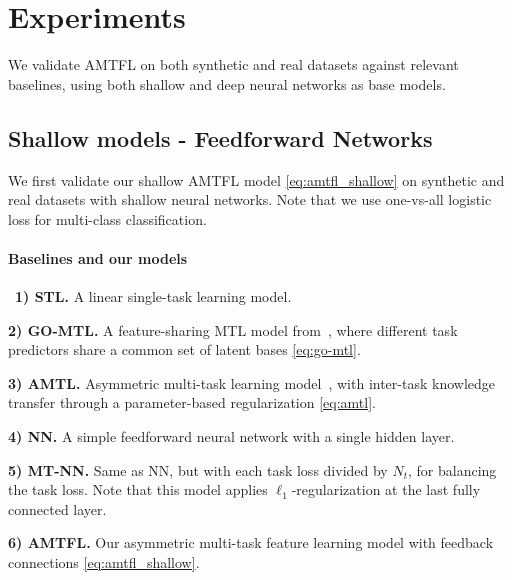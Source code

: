 \documentclass{article}
\begin{document}
	\section{Experiments}
	We validate AMTFL on both synthetic and real datasets against relevant baselines, using both shallow and deep neural networks as base models. 
	
	\subsection{Shallow models - Feedforward Networks}
	We first validate our shallow AMTFL model \eqref{eq:amtfl_shallow} on synthetic and real datasets with shallow neural networks. Note that we use one-vs-all logistic loss for multi-class classification.
	\paragraph{Baselines and our models}
	\ \newline \noindent \textbf{1) STL.} A linear single-task learning model.
	
	\noindent \textbf{2) GO-MTL.} A feature-sharing MTL model from~\cite{go-mtl}, where different task predictors share a common set of latent bases \eqref{eq:go-mtl}.
	
	\noindent \textbf{3) AMTL.} Asymmetric multi-task learning model~\cite{amtl}, with inter-task knowledge transfer through a parameter-based regularization \eqref{eq:amtl}.
	
	\noindent \textbf{4) NN.} A simple feedforward neural network with a single hidden layer.
	
	\noindent \textbf{5) MT-NN.} Same as NN, but with each task loss divided by $N_t$, for balancing the task loss. Note that this model applies $\ell_1$-regularization at the last fully connected layer.
	
	\noindent \textbf{6) AMTFL.} Our asymmetric multi-task feature learning model with feedback connections \eqref{eq:amtfl_shallow}.
	
\end{document}
